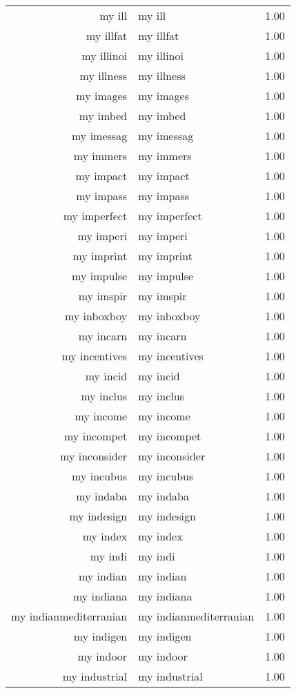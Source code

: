 \begin{table}[ht]
\begin{tabular}{rlr}
  my ill & my ill & 1.00 \\ 
  my illfat & my illfat & 1.00 \\ 
  my illinoi & my illinoi & 1.00 \\ 
  my illness & my illness & 1.00 \\ 
  my images & my images & 1.00 \\ 
  my imbed & my imbed & 1.00 \\ 
  my imessag & my imessag & 1.00 \\ 
  my immers & my immers & 1.00 \\ 
  my impact & my impact & 1.00 \\ 
  my impass & my impass & 1.00 \\ 
  my imperfect & my imperfect & 1.00 \\ 
  my imperi & my imperi & 1.00 \\ 
  my imprint & my imprint & 1.00 \\ 
  my impulse & my impulse & 1.00 \\ 
  my imspir & my imspir & 1.00 \\ 
  my inboxboy & my inboxboy & 1.00 \\ 
  my incarn & my incarn & 1.00 \\ 
  my incentives & my incentives & 1.00 \\ 
  my incid & my incid & 1.00 \\ 
  my inclus & my inclus & 1.00 \\ 
  my income & my income & 1.00 \\ 
  my incompet & my incompet & 1.00 \\ 
  my inconsider & my inconsider & 1.00 \\ 
  my incubus & my incubus & 1.00 \\ 
  my indaba & my indaba & 1.00 \\ 
  my indesign & my indesign & 1.00 \\ 
  my index & my index & 1.00 \\ 
  my indi & my indi & 1.00 \\ 
  my indian & my indian & 1.00 \\ 
  my indiana & my indiana & 1.00 \\ 
  my indianmediterranian & my indianmediterranian & 1.00 \\ 
  my indigen & my indigen & 1.00 \\ 
  my indoor & my indoor & 1.00 \\ 
  my industrial & my industrial & 1.00 \\ 

\end{tabular}
\end{table}
